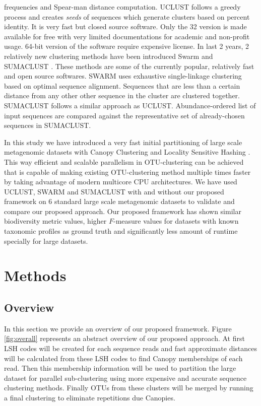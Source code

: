 \documentclass[10pt, conference, compsocconf]{IEEEtran}
\begin{document}
frequencies and Spear-man distance computation. UCLUST \cite{MARuclust} follows a greedy process and creates \textit{seeds} of sequences which generate clusters based on percent identity. It is very fast but closed source software. Only the 32 version is made available for free with very limited documentations for academic and non-profit usage. 64-bit version of the software require expensive license. In last 2 years, 2 relatively new clustering methods have been introduced Swarm \cite{MARSwarm}\cite{MARSwarm2} and SUMACLUST \cite{MARSumaclust}. These methods are some of the currently popular, relatively fast \cite{MARDeNovo} and open source softwares. SWARM uses exhaustive single-linkage clustering based on optimal sequence alignment. Sequences that are less than a certain distance from any other other sequence in the cluster are clustered together. SUMACLUST follows a similar approach as UCLUST. Abundance-ordered list of input sequences are compared against the representative set of already-chosen sequences in SUMACLUST.

In this study we have introduced a very fast initial partitioning of large scale metagenomic datasets with Canopy Clustering \cite{MARCanopy} and Locality Sensitive Hashing \cite{MARLshRef1}\cite{MARLshRef2}\cite{MARLshRef3}. This way efficient and scalable parallelism in OTU-clustering can be achieved that is capable of making existing OTU-clustering method multiple times faster by taking advantage of modern multicore CPU architectures. We have used UCLUST, SWARM and SUMACLUST with and without our proposed framework on 6 standard large scale metagenomic datasets to validate and compare our proposed approach. Our proposed framework has shown similar biodiversity metric values, higher $F$-measure values for datasets with known taxonomic profiles as ground truth and significantly less amount of runtime specially for large datasets.  

\section{Methods}
\label{featMethod}
\subsection{Overview}
In this section we provide an overview of our proposed framework. Figure \ref{fig:overall} represents an abstract overview of our proposed approach. At first LSH codes will be created for each sequence reads and fast approximate distances will be calculated from these LSH codes to find Canopy memberships of each read. Then this membership information will be used to partition the large dataset for parallel sub-clustering using more expensive and accurate sequence clustering methods. Finally OTUs from these clusters will be merged by running a final clustering to eliminate repetitions due Canopies.
\end{document}

